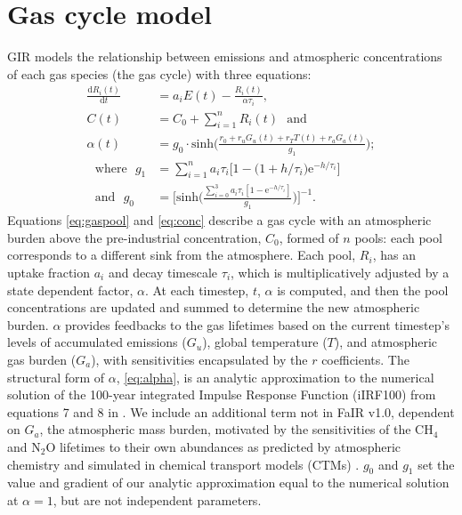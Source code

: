 \documentclass[gmd, manuscript]{copernicus}
\begin{document}
\section{Gas cycle model}
GIR models the relationship between emissions and atmospheric concentrations of each gas species (the gas cycle) with three equations:
\begin{align}
    \frac{\text{d}R_{i}(t)}{\text{d}t} &= a_{i}E(t) - \frac{R_{i}(t)}{\alpha \tau_{i}}, \label{eq:gaspool}\\
    C(t) &= C_0 + \sum_{i=1}^{n}{R_{i}(t)} \text{~~and~~} \label{eq:conc}\\
    \alpha(t) &= g_0 \cdot \text{sinh}\Big(\frac{r_0 + r_uG_{u}(t) + r_TT(t) + r_aG_a(t)}{g_1}\Big); \label{eq:alpha}\\
    \text{~~where~~}g_1 &= \sum_{i=1}^{n}{a_i\tau_i\big[1 - \big(1 + h/\tau_i\big)\text{e}^{-h/\tau_i}\big]} \nonumber\\
    \text{~~and~~}g_0 &= \Big[ \text{sinh} \Big( \frac{ \sum_{i=0}^{3}{a_i \tau_i [1 - \text{e}^{-h/ \tau_i}]}}{g_1} \Big) \Big] ^{-1}. \nonumber
\end{align}
Equations \ref{eq:gaspool} and \ref{eq:conc} describe a gas cycle with an atmospheric burden above the pre-industrial concentration, $C_0$, formed of $n$ pools: each pool corresponds to a different sink from the atmosphere. Each pool, $R_i$, has an uptake fraction $a_i$ and decay timescale $\tau_i$, which is multiplicatively adjusted by a state dependent factor, $\alpha$. At each timestep, $t$, $\alpha$ is computed, and then the pool concentrations are updated and summed to determine the new atmospheric burden. $\alpha$ provides feedbacks to the gas lifetimes based on the current timestep’s levels of accumulated emissions ($G_u$), global temperature ($T$), and atmospheric gas burden ($G_a$), with sensitivities encapsulated by the $r$ coefficients. The structural form of $\alpha$, \eqref{eq:alpha}, is an analytic approximation to the numerical solution of the 100-year integrated Impulse Response Function (iIRF100) from equations 7 and 8 in \cite{Millar2016}. We include an additional term not in FaIR v1.0, dependent on $G_a$, the atmospheric mass burden, motivated by the sensitivities of the CH$_4$ and N$_2$O lifetimes to their own abundances as predicted by atmospheric chemistry and simulated in chemical transport models (CTMs) \citep{Holmes2013,Prather2015}. $g_0$ and $g_1$ set the value and gradient of our analytic approximation equal to the numerical solution at $\alpha = 1$, but are not independent parameters. \\\\
\end{document}
